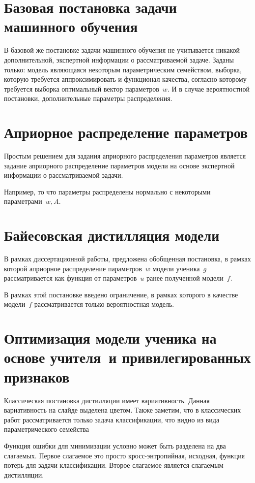 \documentclass[10pt, twoside]{article}
\begin{document}
\section{Базовая постановка задачи машинного обучения}
В базовой же постановке задачи машинного обучения не учитывается никакой дополнительной, экспертной информации о рассматриваемой задаче. Заданы только: модель являющаяся некоторым параметрическим семейством, выборка, которую требуется аппроксимировать и функционал качества, согласно которому требуется выборка оптимальный вектор параметров~$w.$ И в случае вероятностной постановки, дополнительные параметры распределения.

\section{Априорное распределение параметров}
Простым решением для задания априорного распределения параметров является задание априорного распределение параметров модели на основе экспертной информации о рассматриваемой задачи.

Например, то что параметры распределены нормально с некоторыми параметрами~$w, A$.

\section{Байесовская дистилляция модели}
В рамках диссертационной работы, предложена обобщенная постановка, в рамках которой априорное распределение параметров~$w$ модели ученика~$g$ рассматривается как функция от параметров~$u$ ранее полученной модели~$f$.

В рамках этой постановке введено ограничение, в рамках которого в качестве модели~$f$ рассматривается только вероятностная модель.

\section{Оптимизация модели ученика на основе учителя~и привилегированных признаков}
Классическая постановка дистилляции имеет вариативность. Данная вариативность на слайде выделена цветом. Также заметим, что в классических работ рассматривается только задача классификации, что видно из вида параметрического семейства

Функция ошибки для минимизации условно может быть разделена на два слагаемых. Первое слагаемое это просто кросс-энтропийная, исходная, функция потерь для задачи классификации. Второе слагаемое является слагаемым дистилляции.
\end{document}
